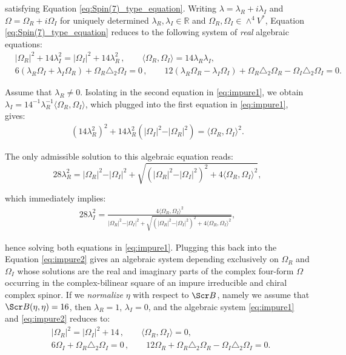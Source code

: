 \documentclass[10pt,a4paper,twoside,reqno]{amsart}
\theoremstyle{plain}
\theoremstyle{definition}
\theoremstyle{remark}
\def\scB{\Scr B}
\begin{document}
\noindent
satisfying Equation \eqref{eq:Spin(7)_type_equation}. Writing $\lambda = \lambda_{R} + i \lambda_{I}$ and $\Omega = \Omega_R + i \Omega_I$ for uniquely determined $\lambda_{R} , \lambda_I \in \mathbb{R}$ and $\Omega_R , \Omega_I \in \wedge^4 V^{\ast}$, Equation \eqref{eq:Spin(7)_type_equation} reduces to the following system of \emph{real} algebraic equations:
\begin{eqnarray}
& \vert \Omega_R \vert^2 + 14 \lambda_I^2 = \vert \Omega_I \vert^2 + 14 \lambda_R^2\, , \qquad \langle \Omega_R , \Omega_I\rangle = 14 \lambda_R \lambda_I, \label{eq:impure1}\\
& 6 (\lambda_R \Omega_I + \lambda_I \Omega_R) + \Omega_R \triangle_2 \Omega_I = 0\, , \qquad 12(\lambda_R \Omega_R - \lambda_I \Omega_I) + \Omega_R \triangle_2 \Omega_R - \Omega_I \triangle_2 \Omega_I = 0. \label{eq:impure2}
\end{eqnarray}

\noindent
Assume that $\lambda_R  \neq 0$. Isolating in the second equation in \eqref{eq:impure1}, we obtain $\lambda_I = 14^{-1} \lambda_R^{-1} \langle \Omega_R , \Omega_I\rangle$, which plugged into the first equation in \eqref{eq:impure1}, gives:
\begin{eqnarray*}
(14 \lambda_R^2)^2 + 14 \lambda_R^2 ( \vert \Omega_I \vert^2 - \vert \Omega_R \vert^2) = \langle \Omega_R , \Omega_I\rangle^2.
\end{eqnarray*}

\noindent
The only admissible solution to this algebraic equation reads:
\begin{equation*}
28 \lambda_R^2 =    \vert \Omega_R \vert^2 - \vert \Omega_I \vert^2 + \sqrt{(\vert \Omega_R \vert^2 - \vert \Omega_I \vert^2)^2 + 4 \langle \Omega_R , \Omega_I\rangle^2},
\end{equation*}

\noindent
which immediately implies:
\begin{eqnarray*}
28\lambda^2_I = \frac{4 \langle \Omega_R , \Omega_I\rangle^2}{\vert \Omega_R \vert^2 - \vert \Omega_I \vert^2 + \sqrt{(\vert \Omega_R \vert^2 - \vert \Omega_I \vert^2)^2 + 4 \langle \Omega_R , \Omega_I\rangle^2}},\end{eqnarray*}

\noindent
hence solving both equations in \eqref{eq:impure1}. Plugging this back into the Equation \eqref{eq:impure2} gives an algebraic system depending exclusively on $\Omega_R$ and $\Omega_I$ whose solutions are the real and imaginary parts of the complex four-form $\Omega$ occurring in the complex-bilinear square of an impure irreducible and chiral complex spinor. If we \emph{normalize} $\eta$ with respect to $\scB$, namely we assume that $\scB(\eta,\eta) =16$, then $\lambda_R = 1$, $\lambda_I = 0$, and the algebraic system \eqref{eq:impure1} and \eqref{eq:impure2} reduces to:
\begin{eqnarray*}
& \vert \Omega_R \vert^2  = \vert \Omega_I \vert^2 + 14 \, , \qquad \langle \Omega_R , \Omega_I\rangle = 0,\\
& 6  \Omega_I +   \Omega_R \triangle_2 \Omega_I = 0\, , \qquad 12 \Omega_R   + \Omega_R \triangle_2 \Omega_R - \Omega_I \triangle_2 \Omega_I = 0.
\end{eqnarray*}
\end{document}
